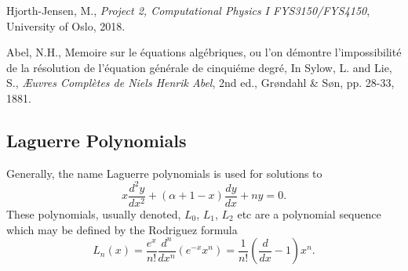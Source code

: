 \documentclass[12pt, a4paper, reqno, article]{amsart}
\begin{document}
\newpage

\begin{thebibliography}{9}

	Hjorth-Jensen, M.,
	\emph{Project 2, Computational Physics I FYS3150/FYS4150},
	University of Oslo,
	2018.

	Abel, N.H.,
	Memoire sur le équations algébriques, ou l'on démontre l'impossibilité de la résolution de l'équation générale de cinquiéme degré,
	In Sylow, L. and Lie, S.,
	\emph{Æuvres Complètes de Niels Henrik Abel}, 2nd ed.,
	Grøndahl \& Søn, pp. 28-33,
	1881.

\end{thebibliography}

\begin{appendix}
\section{Laguerre Polynomials}
\label{app:laguerre}
Generally, the name Laguerre polynomials is used for solutions to
\begin{equation}
x\frac{d^2y}{dx^2}+(\alpha+1-x)\frac{dy}{dx} + ny = 0.
\end{equation}
These polynomials, usually denoted, $L_0$, $L_1$, $L_2$ etc are a polynomial sequence which may be defined by the Rodriguez formula
\begin{equation}
L_n(x) = \frac{e^x}{n!}\frac{d^n}{dx^n}(e^{-x}x^n)=\frac{1}{n!}\left(\frac{d}{dx} -1 \right)x^n.
\end{equation}



\end{appendix}
\end{document}
